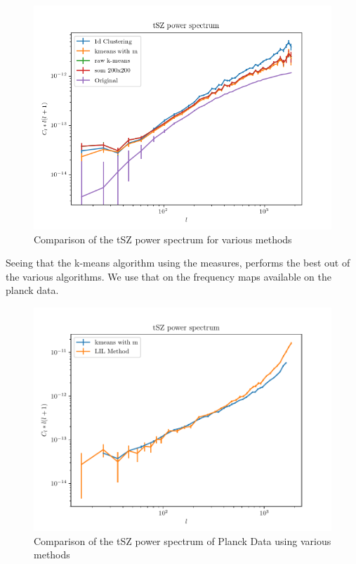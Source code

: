 \begin{figure}[H]
  \label{ffp6res}
  \centering
  \includegraphics[width=0.7\linewidth]{cl_plots.png}
  \caption{Comparison of the tSZ power spectrum for various methods}
\end{figure}

Seeing that the k-means algorithm using the measures, performs the best out of the various algorithms.
We use that on the frequency maps available on the planck data.

\begin{figure}[H]
  \centering
  \includegraphics[width=0.7\linewidth]{sz_spec.pdf}
  \caption{Comparison of the tSZ power spectrum of Planck Data using various methods}
\end{figure}


